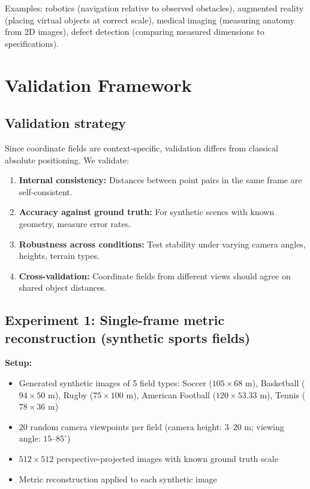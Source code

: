\documentclass[11pt,twocolumn,a4paper]{article}
\theoremstyle{definition}
\begin{document}
Examples: robotics (navigation relative to observed obstacles), augmented reality (placing virtual objects at correct scale), medical imaging (measuring anatomy from 2D images), defect detection (comparing measured dimensions to specifications).

\section{Validation Framework}
\label{sec:validation}

\subsection{Validation strategy}

Since coordinate fields are context-specific, validation differs from classical absolute positioning. We validate:

\begin{enumerate}[leftmargin=1.4em]
  \item \textbf{Internal consistency:} Distances between point pairs in the same frame are self-consistent.
  \item \textbf{Accuracy against ground truth:} For synthetic scenes with known geometry, measure error rates.
  \item \textbf{Robustness across conditions:} Test stability under varying camera angles, heights, terrain types.
  \item \textbf{Cross-validation:} Coordinate fields from different views should agree on shared object distances.
\end{enumerate}

\subsection{Experiment 1: Single-frame metric reconstruction (synthetic sports fields)}

\textbf{Setup:}
\begin{itemize}
  \item Generated synthetic images of 5 field types: Soccer ($105 \times 68$ m), Basketball ($94 \times 50$ m), Rugby ($75 \times 100$ m), American Football ($120 \times 53.33$ m), Tennis ($78 \times 36$ m)
  \item 20 random camera viewpoints per field (camera height: 3--20 m; viewing angle: $15$--$85^\circ$)
  \item $512 \times 512$ perspective-projected images with known ground truth scale
  \item Metric reconstruction applied to each synthetic image
\end{itemize}
\end{document}
